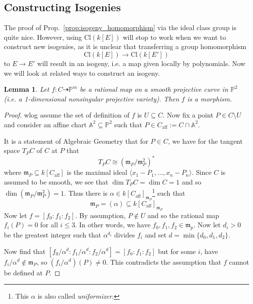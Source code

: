 \documentclass{scrartcl}
\newtheorem{lemma}[prop]{Lemma}
\theoremstyle{definition}
\begin{document}
\subsection{Constructing Isogenies}
The proof of Prop.~\ref{prop:isogeny_homomorphism} via the ideal class group is quite nice.
However, using $\mathrm{Cl}(k[E])$ will stop to work when we want to construct new isogenies, as it is unclear that transferring a group homomorphism
\begin{equation*}
    \mathrm{Cl}(k[E]) \to \mathrm{Cl}(k[E'])
\end{equation*}
to $E \to E'$ will result in an isogeny, i.e. a map given locally by polynomials.
Now we will look at related ways to construct an isogeny.
\begin{lemma}
    Let $f: C \dashrightarrow \mathbb{P}^m$ be a rational map on a smooth projective curve in $\mathbb{P}^2$ (i.e. a 1-dimensional nonsingular projective variety).
    Then $f$ is a morphism.
\end{lemma}
\begin{proof}
    wlog assume the set of definition of $f$ is $U \subseteq C$.
    Now fix a point $P \in C \setminus U$ and consider an affine chart $\mathbb{A}^2 \subseteq \mathbb{P}^2$ such that $P \in C_{\mathrm{aff}} := C \cap \mathbb{A}^2$.

    It is a statement of Algebraic Geometry that for $P \in C$, we have for the tangent space $T_P C$ of $C$ at $P$ that
    \begin{equation*}
        T_P C \cong (\mathfrak{m}_P/\mathfrak{m}_P^2)^*
    \end{equation*}
    where $\mathfrak{m}_P \subseteq k[C_{\mathrm{aff}}]$ is the maximal ideal $\langle x_1 - P_1, ..., x_n - P_n \rangle$.
    Since $C$ is assumed to be smooth, we see that $\dim T_P C = \dim C = 1$ and so $\dim (\mathfrak{m}_P/\mathfrak{m}_P^2) = 1$.
    Thus there is $\alpha \in k[C_{\mathrm{aff}}]_{\mathfrak{m}_P}$\footnote{This $\alpha$ is also called \emph{uniformizer}.} such that
    \begin{equation*}
        \mathfrak{m}_P = (\alpha) \subseteq k[C_{\mathrm{aff}}]_{\mathfrak{m}_P}
    \end{equation*}
    Now let $f = [f_0 : f_1 : f_2]$.
    By assumption, $P \notin U$ and so the rational map $f_i(P) = 0$ for all $i \leq 3$.
    In other words, we have $f_0, f_1, f_2 \in \mathfrak{m}_p$.
    Now let $d_i > 0$ be the greatest integer such that $\alpha^{d_i}$ divides $f_i$ and set $d = \min\{d_0, d_1, d_2\}$.

    Now find that $[f_0/\alpha^d : f_1/\alpha^d : f_2/\alpha^d] = [f_0 : f_1 : f_2]$ but for some $i$, have $f_i/\alpha^d \notin \mathfrak{m}_P$, so $(f_i/\alpha^d)(P) \neq 0$.
    This contradicts the assumption that $f$ cannot be defined at $P$.
\end{proof}
\end{document}
